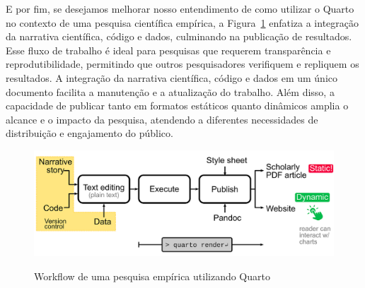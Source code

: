 \documentclass[
  a4paper,
]{article}
\begin{document}
E por fim, se desejamos melhorar nosso entendimento de como utilizar o
Quarto no contexto de uma pesquisa científica empírica, a
Figura~\ref{fig-all-workflow} enfatiza a integração da narrativa
científica, código e dados, culminando na publicação de resultados. Esse
fluxo de trabalho é ideal para pesquisas que requerem transparência e
reprodutibilidade, permitindo que outros pesquisadores verifiquem e
repliquem os resultados. A integração da narrativa científica, código e
dados em um único documento facilita a manutenção e a atualização do
trabalho. Além disso, a capacidade de publicar tanto em formatos
estáticos quanto dinâmicos amplia o alcance e o impacto da pesquisa,
atendendo a diferentes necessidades de distribuição e engajamento do
público.

\begin{figure}

\href{https://towardsdatascience.com/technical-writing-and-publishing-data-rich-articles-with-quarto-d61a56bcaa64}{\includegraphics{img/all-workflow.png}}

\caption{\label{fig-all-workflow}Workflow de uma pesquisa empírica
utilizando Quarto}

\end{figure}%
\end{document}
